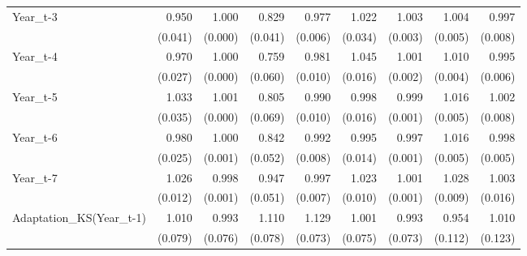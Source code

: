 \begin{table}[htbp]
\begin{tabular}{l*{8}{D{.}{.}{-1}}}
Year\_t-3    &       0.950         &       1.000         &       0.829\sym{***}&       0.977\sym{***}&       1.022         &       1.003         &       1.004         &       0.997         \\
            &     (0.041)         &     (0.000)         &     (0.041)         &     (0.006)         &     (0.034)         &     (0.003)         &     (0.005)         &     (0.008)         \\
Year\_t-4    &       0.970         &       1.000         &       0.759\sym{***}&       0.981\sym{*}  &       1.045\sym{***}&       1.001         &       1.010\sym{**} &       0.995         \\
            &     (0.027)         &     (0.000)         &     (0.060)         &     (0.010)         &     (0.016)         &     (0.002)         &     (0.004)         &     (0.006)         \\
Year\_t-5    &       1.033         &       1.001\sym{**} &       0.805\sym{**} &       0.990         &       0.998         &       0.999         &       1.016\sym{***}&       1.002         \\
            &     (0.035)         &     (0.000)         &     (0.069)         &     (0.010)         &     (0.016)         &     (0.001)         &     (0.005)         &     (0.008)         \\
Year\_t-6    &       0.980         &       1.000         &       0.842\sym{***}&       0.992         &       0.995         &       0.997\sym{*}  &       1.016\sym{***}&       0.998         \\
            &     (0.025)         &     (0.001)         &     (0.052)         &     (0.008)         &     (0.014)         &     (0.001)         &     (0.005)         &     (0.005)         \\
Year\_t-7    &       1.026\sym{**} &       0.998\sym{**} &       0.947         &       0.997         &       1.023\sym{**} &       1.001         &       1.028\sym{***}&       1.003         \\
            &     (0.012)         &     (0.001)         &     (0.051)         &     (0.007)         &     (0.010)         &     (0.001)         &     (0.009)         &     (0.016)         \\
Adaptation\_KS(Year\_t-1)&       1.010         &       0.993         &       1.110\sym{\%}  &       1.129\sym{*}  &       1.001         &       0.993         &       0.954         &       1.010         \\
            &     (0.079)         &     (0.076)         &     (0.078)         &     (0.073)         &     (0.075)         &     (0.073)         &     (0.112)         &     (0.123)         \\

\end{tabular}
\end{table}
